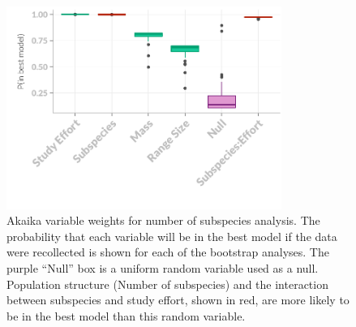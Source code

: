 \begin{knitrout}\footnotesize
{}\color{fgcolor}\begin{figure}[t]

{\centering \includegraphics[width=0.8\textwidth]{figure/ITPlots-1} 

}

\caption[Akaika variable weights for number of subspecies analysis]{Akaika variable weights for number of subspecies analysis. The probability that each variable will be in the best model if the data were recollected is shown for each of the bootstrap analyses. The purple ``Null'' box is a uniform random variable used as a null. Population structure (Number of subspecies) and the interaction between subspecies and study effort, shown in red, are more likely to be in the best model than this random variable.}\label{fig:ITPlots}
\end{figure}


\end{knitrout}







\clearpage





























